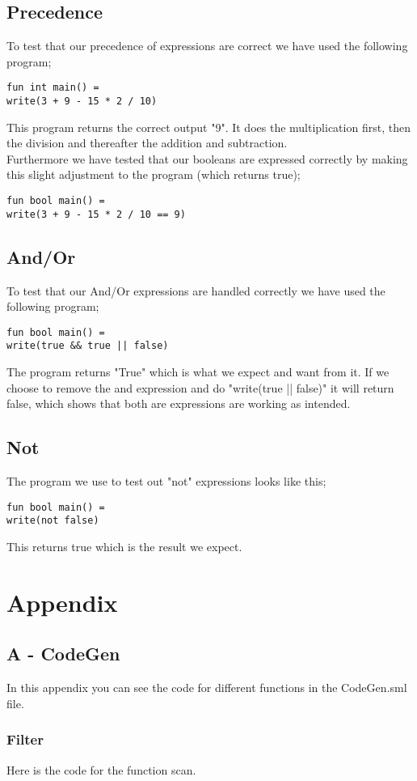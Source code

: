 \documentclass[12pt]{article}
\begin{document}
\begin{center}
\begin{center}
\subsection{Precedence}
To test that our precedence of expressions are correct we have used the following program;
\begin{verbatim}
fun int main() =
write(3 + 9 - 15 * 2 / 10)
\end{verbatim}
This program returns the correct output "9". It does the multiplication first, then the division and thereafter the addition and subtraction.\\
Furthermore we have tested that our booleans are expressed correctly by making this slight adjustment to the program (which returns true);
\begin{verbatim}
fun bool main() =
write(3 + 9 - 15 * 2 / 10 == 9)
\end{verbatim}
\subsection{And/Or}
To test that our And/Or expressions are handled correctly we have used the following program;
\begin{verbatim}
fun bool main() =
write(true && true || false)
\end{verbatim}
The program returns "True" which is what we expect and want from it. If we choose to remove the and expression and do "write(true || false)" it will return false, which shows that both are expressions are working as intended.
\subsection{Not}
The program we use to test out "not" expressions looks like this;
\begin{verbatim}
fun bool main() =
write(not false)
\end{verbatim}
This returns true which is the result we expect.

\section{Appendix}
\subsection{A - CodeGen}
In this appendix you can see the code for different functions in the CodeGen.sml file.

\subsubsection{Filter}
Here is the code for the function scan. 


\end{center}
\end{center}
\end{document}
